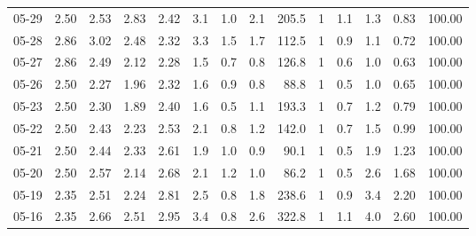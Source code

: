 \begin{threeparttable}
{\begin{tabular}{lrrrrrrrrrrrrr}
  05-29 &          2.50 &          2.53 &          2.83 &        2.42 &                 3.1 &                 1.0 &        2.1 &        205.5 &              1 &                 1.1 &              1.3 &            0.83 &                 100.00 \\
  05-28 &          2.86 &          3.02 &          2.48 &        2.32 &                 3.3 &                 1.5 &        1.7 &        112.5 &              1 &                 0.9 &              1.1 &            0.72 &                 100.00 \\
  05-27 &          2.86 &          2.49 &          2.12 &        2.28 &                 1.5 &                 0.7 &        0.8 &        126.8 &              1 &                 0.6 &              1.0 &            0.63 &                 100.00 \\
  05-26 &          2.50 &          2.27 &          1.96 &        2.32 &                 1.6 &                 0.9 &        0.8 &         88.8 &              1 &                 0.5 &              1.0 &            0.65 &                 100.00 \\
  05-23 &          2.50 &          2.30 &          1.89 &        2.40 &                 1.6 &                 0.5 &        1.1 &        193.3 &              1 &                 0.7 &              1.2 &            0.79 &                 100.00 \\
  05-22 &          2.50 &          2.43 &          2.23 &        2.53 &                 2.1 &                 0.8 &        1.2 &        142.0 &              1 &                 0.7 &              1.5 &            0.99 &                 100.00 \\
  05-21 &          2.50 &          2.44 &          2.33 &        2.61 &                 1.9 &                 1.0 &        0.9 &         90.1 &              1 &                 0.5 &              1.9 &            1.23 &                 100.00 \\
  05-20 &          2.50 &          2.57 &          2.14 &        2.68 &                 2.1 &                 1.2 &        1.0 &         86.2 &              1 &                 0.5 &              2.6 &            1.68 &                 100.00 \\
  05-19 &          2.35 &          2.51 &          2.24 &        2.81 &                 2.5 &                 0.8 &        1.8 &        238.6 &              1 &                 0.9 &              3.4 &            2.20 &                 100.00 \\
  05-16 &          2.35 &          2.66 &          2.51 &        2.95 &                 3.4 &                 0.8 &        2.6 &        322.8 &              1 &                 1.1 &              4.0 &            2.60 &                 100.00 \\

\end{tabular}}
\end{threeparttable}
